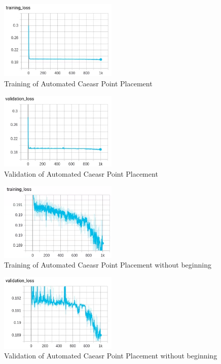 \begin{figure}[!htb]
	\caption{Training of Automated Caeasr Point Placement}
	\centering
\includegraphics[width=0.5\textwidth]{images/training.png}
\end{figure}
\begin{figure}[!htb]
	\caption{Validation of Automated Caeasr Point Placement}
	\centering
\includegraphics[width=0.5\textwidth]{images/validation.png}
\end{figure}
 \begin{figure}[!htb]
	\caption{Training of Automated Caeasr Point Placement without beginning}
	\centering
\includegraphics[width=0.5\textwidth]{images/train_close.png}
\end{figure}
\begin{figure}[!htb]
	\caption{Validation of Automated Caeasr Point Placement without beginning}
	\centering
\includegraphics[width=0.5\textwidth]{images/val_close.png}
\end{figure}

